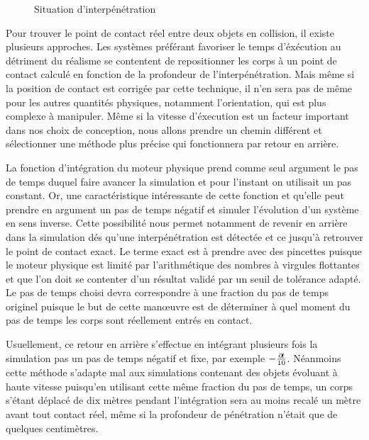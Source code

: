 \begin{figure}
  \centering
  
  \caption{Situation d'interpénétration}
\end{figure}

Pour trouver le point de contact réel entre deux objets en collision,
il existe plusieurs approches. Les systèmes préférant favoriser le
temps d'éxécution au détriment du réalisme se contentent de
repositionner les corps à un point de contact calculé en fonction de
la profondeur de l'interpénétration. Mais même si la position de
contact est corrigée par cette technique, il n'en sera pas de même
pour les autres quantités physiques, notamment l'orientation, qui est
plus complexe à manipuler. Même si la vitesse d'éxecution est un
facteur important dans nos choix de conception, nous allons prendre un
chemin différent et sélectionner une méthode plus précise qui
fonctionnera par retour en arrière.

La fonction d'intégration du moteur physique prend comme seul argument
le pas de temps duquel faire avancer la simulation et pour l'instant
on utilisait un pas constant. Or, une caractéristique intéressante de
cette fonction et qu'elle peut prendre en argument un pas de temps
négatif et simuler l'évolution d'un système en sens inverse. Cette
possibilité nous permet notamment de revenir en arrière dans la
simulation dés qu'une interpénétration est détectée et ce jusqu'à
retrouver le point de contact exact. Le terme \og exact \fg{} est à
prendre avec des pincettes puisque le moteur physique est limité par
l'arithmétique des nombres à virgules flottantes et que l'on doit se
contenter d'un résultat validé par un seuil de tolérance adapté. Le
pas de temps choisi devra correspondre à une fraction du pas de temps
originel puisque le but de cette man\oe uvre est de déterminer à quel
moment du pas de temps les corps sont réellement entrés en contact.

Usuellement, ce retour en arrière s'effectue en intégrant plusieurs
fois la simulation pas un pas de temps négatif et fixe, par exemple
$-\frac{\partial \! t}{10}$. Néanmoins cette méthode s'adapte mal aux
simulations contenant des objets évoluant à haute vitesse puisqu'en
utilisant cette même fraction du pas de temps, un corps s'étant
déplacé de dix mètres pendant l'intégration sera au moins recalé un
mètre avant tout contact réel, même si la profondeur de pénétration
n'était que de quelques centimètres.

